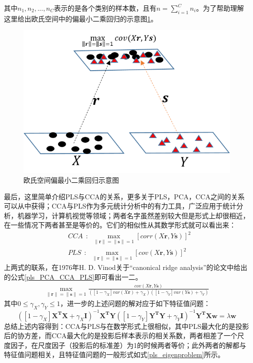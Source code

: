 其中$n_1,n_2,...,n_C$表示的是各个类别的样本数，且有$n=\sum_{i=1}^{C}n_i$。为了帮助理解这里给出欧氏空间中的偏最小二乘回归的示意图\ref{fig:PLS_Euclidean}。
\begin{figure}[h]
	\centering
	\includegraphics[width=0.5\linewidth]{source/PLS_Euclidean.png}
  	\caption{欧氏空间偏最小二乘回归示意图}
  	\label{fig:PLS_Euclidean}
\end{figure}

最后，这里简单介绍PLS与CCA的关系，更多关于PLS，PCA，CCA之间的关系可以从\cite{pls_PLSALL}中获得；CCA与PLS作为多元统计分析中的有力工具，广泛应用于统计分析，机器学习，计算机视觉等领域；两者名字虽然差别较大但是形式上却很相近，在一些情况下两者甚至是等价的。它们的相似性从其数学形式就可以看出来：
\begin{equation}
\label{pls_CCA_VS_PLS}
\begin{split}
&CCA~~:~~\max_{\|\bm{r}\|=\|\bm{s}\|=1}[corr(X\bm{r},Y\bm{s})]^2\\
&PLS~~:~~\max_{\|\bm{r}\|=\|\bm{s}\|=1}[cov(X\bm{r},Y\bm{s})]^2
\end{split}
\end{equation}
上两式的联系，在1976年H. D. Vinod关于“canonical ridge analysis”的论文\cite{pls_Canonical_ridge}中给出的公式\ref{pls_PCA_CCA_PLS}即可看出一二。
\begin{equation}
\label{pls_PCA_CCA_PLS}
\begin{split}
\max_{\|\bm{r}\|=\|\bm{s}\|=1}\frac{cov(X\bm{r},Y\bm{s})}{([1-\gamma_X]var(X\bm{r})+\gamma_X)([1-\gamma_Y]var(Y\bm{s})+\gamma_Y)}
\end{split}
\end{equation}
其中$0\leq \gamma_X,\gamma_Y \leq 1$，进一步的上述问题的解对应于如下特征值问题：
\begin{equation}
\label{pls_eigenproblem}
([1-\gamma_X]\bm{X^{T}X}+\gamma_X\bm{I})^{-1}\bm{X^{T}Y}([1-\gamma_Y]\bm{Y^{T}Y}+\gamma_Y\bm{I})^{-1}\bm{Y^{T}Xw}=\lambda\bm{w}
\end{equation}
总结上述内容得到：CCA与PLS与在数学形式上很相似，其中PLS最大化的是投影后的协方差，而CCA最大化的是投影后样本表示的相关系数，两者相差了一个尺度因子，在尺度因子（投影后的标准差）为1的时候两者等价；此外两者的解都与特征值问题相关，且特征值问题的一般形式如式\ref{pls_eigenproblem}所示。

